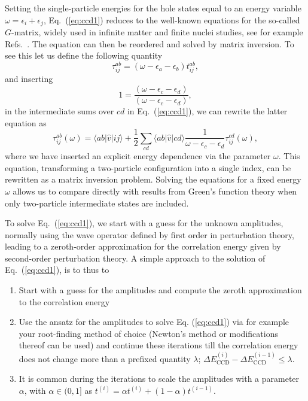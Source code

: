   Setting the single-particle energies for the hole states equal to an
  energy variable $\omega = \epsilon_i+\epsilon_j$,
  Eq.~(\ref{eq:ccd1}) reduces to the well-known equations for the
  so-called $G$-matrix, widely used in infinite matter and finite
  nuclei studies, see for example Refs.~\cite{day1967,hh2000}.  The equation can then be reordered
  and solved by matrix inversion.  To see this let us define the
  following quantity
  \[
  \tau_{ij}^{ab}=
  \left(\omega-\epsilon_a-\epsilon_b\right)t_{ij}^{ab},
  \]
  and inserting
  \[
  1=\frac{\left(\omega-\epsilon_c-\epsilon_d\right)}{\left(\omega-\epsilon_c-\epsilon_d\right)},
  \]
  in the intermediate sums over $cd$ in Eq.~(\ref{eq:ccd1}), we can
  rewrite the latter equation as
  \[
  \tau_{ij}^{ab}(\omega)= \langle ab \vert \hat{v} \vert ij \rangle +
  \frac{1}{2}\sum_{cd} \langle ab \vert \hat{v} \vert cd \rangle
  \frac{1}{\omega-\epsilon_c-\epsilon_d}\tau_{ij}^{cd}(\omega),
  \]
  where we have inserted an explicit energy dependence via the parameter $\omega$. This
  equation, transforming a two-particle configuration into a single
  index, can be rewritten as  a matrix inversion problem.  Solving
  the equations for a fixed energy $\omega$ allows us to compare
  directly with results from Green's function theory when only
  two-particle intermediate states are included.

  To solve Eq.~(\ref{eq:ccd1}), we start with a guess for
  the unknown amplitudes, normally using the wave operator defined by
  first order in perturbation theory, leading to a zeroth-order
  approximation for the correlation energy given by second-order perturbation
  theory.  A simple approach to the
  solution of Eq.~(\ref{eq:ccd1}), is to thus to
  \begin{enumerate}
  \item Start with a guess for the amplitudes and compute the zeroth
    approximation to the correlation energy

  \item Use the ansatz for the amplitudes to solve Eq. (\ref{eq:ccd1})
    via for example your root-finding method of choice (Newton's
    method or modifications thereof can be used) and continue these
    iterations till the correlation energy does not change more than a
    prefixed quantity $\lambda$; $\Delta E_{\mathrm{CCD}}^{(i)}-\Delta E_{\mathrm{CCD}}^{(i-1)} \le \lambda$.

  \item It is common during the iterations to scale the amplitudes
    with a parameter $\alpha$, with $\alpha \in (0,1]$ as
      $t^{(i)}=\alpha t^{(i)}+(1-\alpha)t^{(i-1)}$.
  \end{enumerate}

